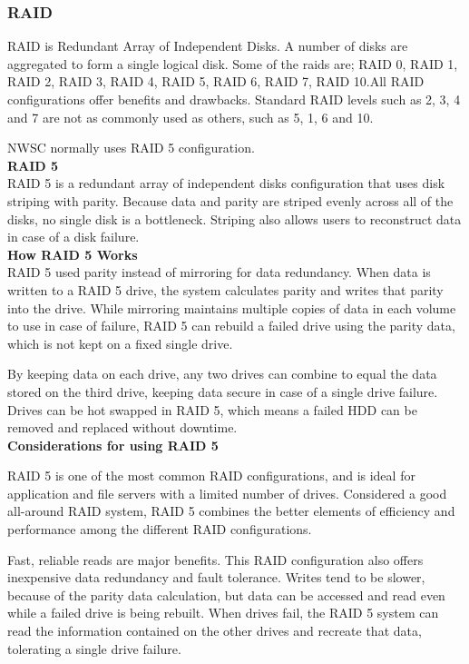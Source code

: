 \documentclass{article}
\begin{document}
\subsubsection{RAID}
RAID is Redundant Array of Independent Disks. A number of disks are aggregated to form a single logical disk. Some of the raids are; RAID 0, RAID 1, RAID 2, RAID 3, RAID 4, RAID 5, RAID 6, RAID 7, RAID 10.All RAID configurations offer benefits and drawbacks. Standard RAID levels such as 2, 3, 4 and 7 are not as commonly used as others, such as 5, 1, 6 and 10. 
\par NWSC normally uses RAID 5 configuration.\\
\textbf{RAID 5} \cite{chen1993design}\\
RAID 5 is a redundant array of independent disks configuration that uses disk striping with parity. Because data and parity are striped evenly across all of the disks, no single disk is a bottleneck. Striping also allows users to reconstruct data in case of a disk failure.\\
\textbf{How RAID 5 Works} \cite{gray1990parity}\\
RAID 5 used parity instead of mirroring for data redundancy. When data is written to a RAID 5 drive, the system calculates parity and writes that parity into the drive. While mirroring maintains multiple copies of data in each volume to use in case of failure, RAID 5 can rebuild a failed drive using the parity data, which is not kept on a fixed single drive.
\par By keeping data on each drive, any two drives can combine to equal the data stored on the third drive, keeping data secure in case of a single drive failure. Drives can be hot swapped in RAID 5, which means a failed HDD can be removed and replaced without downtime.\\
\textbf{Considerations for using RAID 5}
\par RAID 5 is one of the most common RAID configurations, and is ideal for application and file servers with a limited number of drives. Considered a good all-around RAID system, RAID 5 combines the better elements of efficiency and performance among the different RAID configurations.
\par Fast, reliable reads are major benefits. This RAID configuration also offers inexpensive data redundancy and fault tolerance. Writes tend to be slower, because of the parity data calculation, but data can be accessed and read even while a failed drive is being rebuilt. When drives fail, the RAID 5 system can read the information contained on the other drives and recreate that data, tolerating a single drive failure.
\end{document}
